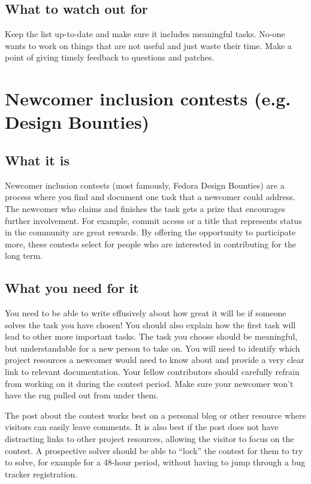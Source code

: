 \subsection{What to watch out for}
Keep the list up-to-date and make sure it includes meaningful tasks. No-one wants to work on things that are not useful and just waste their time. Make a point of giving timely feedback to questions and patches.

\section{Newcomer inclusion contests (e.g. Design Bounties)}
\subsection{What it is}
Newcomer inclusion contests (most famously, Fedora Design Bounties) are a process where you find and document one task that a newcomer could address. The newcomer who claims and finishes the task gets a prize that encourages further involvement. For example, commit access or a title that represents status in the community are great rewards. By offering the opportunity to participate more, these contests select for people who are interested in contributing for the long term.

\subsection{What you need for it}
You need to be able to write effusively about how great it will be if someone solves the task you have chosen! You should also explain how the first task will lead to other more important tasks. The task you choose should be meaningful, but understandable for a new person to take on. You will need to identify which project resources a newcomer would need to know about and provide a very clear link to relevant documentation. Your fellow contributors should carefully refrain from working on it during the contest period. Make sure your newcomer won’t have the rug pulled out from under them. 

The post about the contest works best on a personal blog or other resource where visitors can easily leave comments. It is also best if the post does not have distracting links to other project resources, allowing the visitor to focus on the contest. A prospective solver should be able to “lock” the contest for them to try to solve, for example for a 48-hour period, without having to jump through a bug tracker registration.

